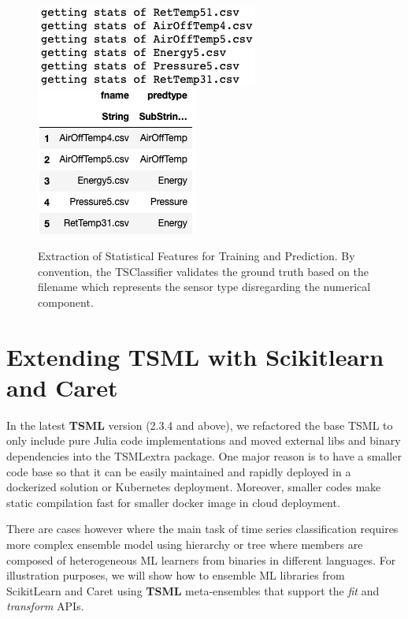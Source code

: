 \documentclass{juliacon}
\begin{document}
\begin{figure}[htbp]
   \centering
   \includegraphics[width=0.5\columnwidth]{tscl1.png} %
   \vskip 2pt
   \includegraphics[width=0.4\columnwidth]{tscl2.png} %
   \caption{Extraction of Statistical Features for Training and Prediction. By convention, the TSClassifier validates the ground truth based on the filename which represents the sensor type disregarding the numerical component.}
   \label{fig:tcl}
\end{figure}

\section{Extending TSML with Scikitlearn and Caret}
In the latest \textbf{TSML} version (2.3.4 and above), 
we refactored the base TSML
to only include pure Julia code implementations and moved
external libs and binary dependencies into the TSMLextra package. 
One major reason is to have a smaller code base so that it can be easily
maintained and rapidly deployed in a dockerized solution or Kubernetes deployment. Moreover, smaller codes make
static compilation fast for smaller docker image  
in cloud deployment. 

There are cases however where the main task of time series classification 
requires more complex ensemble model using hierarchy or tree where 
members are composed of heterogeneous ML learners from binaries in 
different languages. For illustration purposes, we will show how to 
ensemble ML libraries from ScikitLearn and Caret using \textbf{TSML} 
meta-ensembles that support the \emph{fit} and \emph{transform} APIs.

\vskip 6pt
\end{document}
